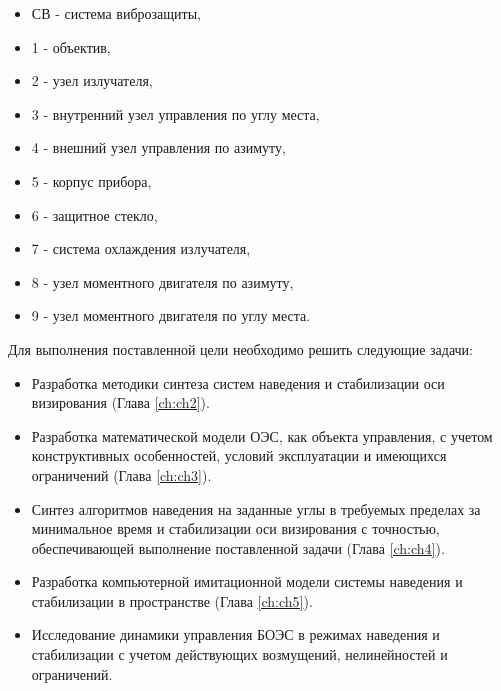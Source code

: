 \begin{itemize}
	\item СВ - система виброзащиты,
	\item 1 - объектив,
	\item 2 - узел излучателя,
	\item 3 - внутренний узел управления по углу места,
	\item 4 - внешний узел управления по азимуту,
	\item 5 - корпус прибора,
	\item 6 - защитное стекло,
	\item 7 - система охлаждения излучателя,
	\item 8 - узел моментного двигателя по азимуту,
	\item 9 - узел моментного двигателя по углу места.
\end{itemize}

Для выполнения поставленной цели необходимо решить следующие задачи:

\begin{itemize}
	\item Разработка методики синтеза систем наведения и стабилизации оси визирования (Глава \ref{ch:ch2}).
	\item Разработка математической модели ОЭС, как объекта управления, с учетом конструктивных особенностей, условий эксплуатации и имеющихся ограничений (Глава \ref{ch:ch3}).
	\item Синтез алгоритмов наведения на заданные углы в требуемых пределах за минимальное время и стабилизации оси визирования с точностью, обеспечивающей выполнение поставленной задачи (Глава \ref{ch:ch4}).
	\item Разработка компьютерной имитационной модели системы наведения и стабилизации в пространстве (Глава \ref{ch:ch5}).
	\item Исследование динамики управления БОЭС в режимах наведения и стабилизации с учетом действующих возмущений, нелинейностей и ограничений.
\end{itemize}

\clearpage
